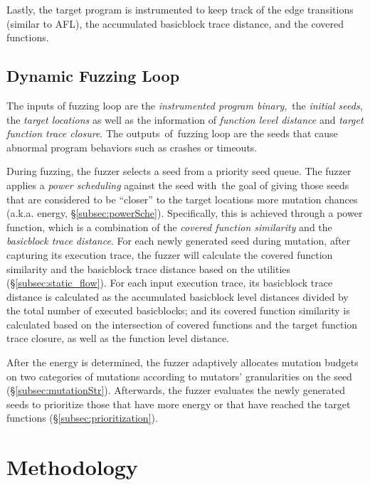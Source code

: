 Lastly, the target program is instrumented to keep track of the edge transitions (similar to AFL), the accumulated basicblock trace distance, and the covered functions.


\subsection{Dynamic Fuzzing Loop}\label{sec:fuzz_flow}

The inputs of fuzzing loop are the \textit{instrumented program binary},~the \textit{initial seeds}, the \textit{target locations} as well as the information of \textit{function level distance} and \textit{target function trace closure}.
The outputs~of~fuzzing loop are the seeds that cause abnormal program behaviors such as crashes or timeouts.

During fuzzing, the fuzzer selects a seed from a priority seed queue. The fuzzer applies a \textit{power scheduling} against the seed with~the goal of giving those seeds that are considered to be ``closer'' to the target locations more mutation chances (a.k.a. energy, \S\ref{subsec:powerSche}). Specifically, this is achieved through a power function, which is a combination of the \textit{covered function similarity} and the \textit{basicblock trace distance}. For each newly generated seed during mutation, after capturing its execution trace, the fuzzer will calculate the covered function similarity and the basicblock trace distance based on the utilities (\S\ref{subsec:static_flow}). For each input execution trace, its basicblock trace distance is calculated as the accumulated basicblock level distances divided by the total number of executed basicblocks; and its covered function similarity is calculated based on the intersection of covered functions and the target function trace closure, as well as the function level distance.

After the energy is determined, the fuzzer adaptively allocates mutation budgets on two categories of mutations according to mutators' granularities on the seed (\S\ref{subsec:mutationStr}).
Afterwards, the fuzzer evaluates the newly generated seeds to prioritize those that have more energy or that have reached the target functions (\S\ref{subsec:prioritization}).



\section{Methodology}

